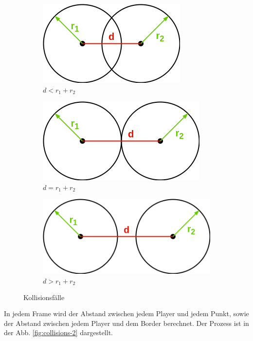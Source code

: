 \documentclass[doktyp=studarbeit]{TUBAFarbeiten}
\begin{document}
\begin{figure}[!htb]
    \centering
    \begin{subfigure}[b]{0.45\textwidth}
        \centering
        \includegraphics[height=0.1\textheight]{collisions-3.png}
        \caption{$d < r_{1} + r_{2}$}
    \end{subfigure}
    \qquad
    \begin{subfigure}[b]{0.45\textwidth}
        \centering
        \includegraphics[height=0.1\textheight]{collisions-4.png}
        \caption{$d = r_{1} + r_{2}$}
    \end{subfigure}
    \qquad
    \begin{subfigure}[b]{0.45\textwidth}
        \centering
        \includegraphics[height=0.1\textheight]{collisions-5.png}
        \caption{$d > r_{1} + r_{2}$}
    \end{subfigure}
    \caption{Kollisionsfälle}
    \label{fig:collisions-1}
\end{figure}

\FloatBarrier
In jedem Frame wird der Abstand zwischen jedem Player und jedem Punkt,
sowie der Abstand zwischen jedem Player und dem Border berechnet. 
Der Prozess ist in der Abb. \ref{fig:collisions-2} dargestellt.
\end{document}

